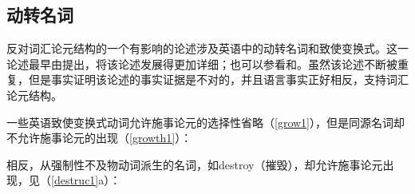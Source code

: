\subsection{动转名词}
\label{deverbal-sec}

反对词汇论元结构的一个有影响的论述涉及英语中的动转名词和致使变换式。这一论述最早由\citet{Chomsky70a}提出，\citet{Marantz97a}将该论述发展得更加详细；也可以参看\citet{Pesetsky96a-u}和\citet{HN2000a}。虽然该论述不断被重复，但是事实证明该论述的事实证据是不对的，并且语言事实正好相反，支持词汇论元结构\citep{Wechsler2008b, Wechsler2008a}。

一些英语致使变换式动词允许施事论元的选择性省略（\ref{grow1}），但是同源名词却不允许施事论元的出现（\ref{growth1}）：

\eal
\label{grow1}
\zl

\eal
\label{growth1}
\zl
%
相反，从强制性不及物动词派生的名词，如destroy（摧毁），却允许施事论元出现，见（\ref{destruc1}a）：

